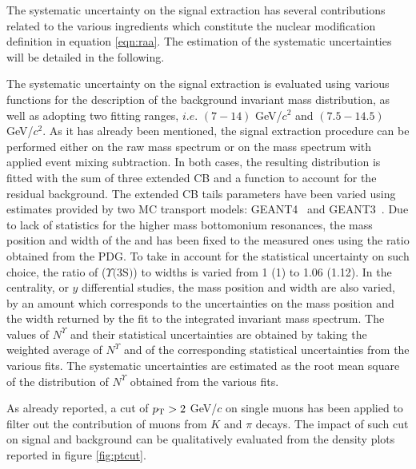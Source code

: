 The systematic uncertainty on the signal extraction has several contributions related to the various ingredients which constitute the nuclear modification definition in equation \ref{eqn:raa}.
The estimation of the systematic uncertainties will be detailed in the following.

The systematic uncertainty on the signal extraction is evaluated using various functions for the description of the background invariant mass distribution, as well as adopting two fitting ranges, $i.e.$ $(7-14)$ GeV/$c^2$ and $(7.5-14.5)$ GeV/$c^2$.
As it has already been mentioned, the signal extraction procedure can be performed either on the raw mass spectrum or on the mass spectrum with applied event mixing subtraction.
In both cases, the resulting distribution is fitted with the sum of three extended CB and a function to account for the residual background.
The extended CB tails parameters have been varied using estimates provided by two MC transport models: GEANT4~\cite{Agostinelli:2002hh} and GEANT3~\cite{Brun:1082634}. 
Due to lack of statistics for the higher mass bottomonium resonances, the mass position and width of the \upsiss and \upsisss has been fixed to the \upsis measured ones using the ratio obtained from the PDG.
To take in account for the statistical uncertainty on such choice, the ratio of \upsiss ($\Upsilon\text{(3S)}$) to \upsis widths is varied from 1 (1) to 1.06 (1.12).
In the centrality, \pt or $y$ differential studies, the mass position and width are also varied, by an amount which corresponds to the uncertainties on the mass position and the width returned by the fit to the integrated invariant mass spectrum. 
The values of $N^{\Upsilon}$ and their statistical uncertainties are obtained by taking the weighted average of $N^{\Upsilon}$ and of the corresponding statistical uncertainties from the various fits.
The systematic uncertainties are estimated as the root mean square of the distribution of $N^{\Upsilon}$ obtained from the various fits.

As already reported, a cut of $p_{\rm T} > 2$ GeV/$c$ on single muons has been applied to filter out the contribution of muons from $K$ and $\pi$ decays.
The impact of such cut on signal and background can be qualitatively evaluated from the density plots reported in figure \ref{fig:ptcut}.


